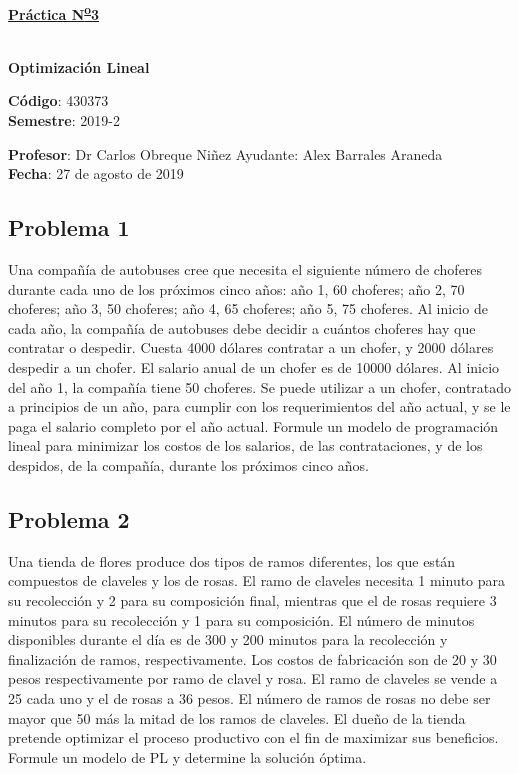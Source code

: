\documentclass[letterpaper]{article}
\begin{document}
\vspace*{0.5\baselineskip}
\begin{center}
\begin{Large}
\textbf{\underline{Práctica N\textsuperscript{\underline{o}}3}}
\end{Large}\\
\vspace*{0.5\baselineskip}
\textbf{Optimización Lineal} \\
\vspace*{0.5\baselineskip}
\begin{footnotesize}
\textbf{Código}: 430373\\
\textbf{Semestre}: 2019-2
\end{footnotesize}
\end{center}

\noindent \textbf{Profesor}: Dr Carlos Obreque Niñez  \hfill Ayudante: Alex Barrales Araneda\\
\noindent \textbf{Fecha}: 27 de agosto de 2019

\subsection*{Problema 1}
Una compañía de autobuses cree que necesita el siguiente número de choferes durante cada uno de los próximos cinco años: año 1, 60 choferes; año 2, 70 choferes; año 3, 50 choferes; año 4, 65 choferes; año 5, 75 choferes. Al inicio de cada año, la compañía de autobuses debe decidir a cuántos choferes hay que contratar o despedir. Cuesta 4000 dólares contratar a un chofer, y 2000 dólares despedir a un chofer. El salario anual de un chofer es de 10000 dólares. Al inicio del año 1, la compañía tiene 50 choferes. Se puede utilizar a un chofer, contratado a principios de un año, para cumplir con los requerimientos del año actual, y se le paga el salario completo por el año actual. Formule un modelo de programación lineal para minimizar los costos de los salarios, de las contrataciones, y de los despidos, de la compañía, durante los próximos cinco años.

\subsection*{Problema 2}
Una tienda de flores produce dos tipos de ramos diferentes, los que están compuestos de claveles y los de rosas. El ramo de claveles necesita 1 minuto para su recolección y 2 para su composición final, mientras que el de rosas requiere 3 minutos para su recolección y 1 para su composición. El número de minutos disponibles durante el día es de 300 y 200 minutos para la recolección y finalización de ramos, respectivamente. Los costos de fabricación son de 20 y 30 pesos respectivamente por ramo de clavel y rosa. El ramo de claveles se vende a 25 cada uno y el de rosas a 36 pesos. El número de ramos de rosas no debe ser mayor que 50 más la mitad de los ramos de claveles. El dueño de la tienda pretende optimizar el proceso productivo con el fin de maximizar sus beneficios. Formule un modelo de PL y determine la solución óptima.
\end{document}
